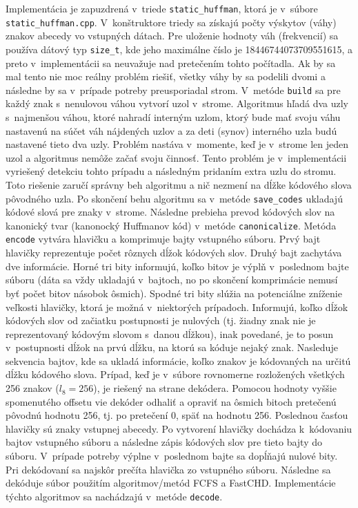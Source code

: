 \documentclass[10pt,a4paper]{article}
\begin{document}
Implementácia je zapuzdrená v~triede \texttt{static\_huffman}, ktorá je v~súbore \texttt{static\_huffman.cpp}. V~konštruktore triedy sa získajú počty výskytov (váhy) znakov abecedy vo vstupných dátach. Pre uloženie hodnoty váh (frekvencií) sa používa dátový typ \texttt{size\_t}, kde jeho maximálne číslo je 18446744073709551615, a preto v~implementácii sa neuvažuje nad pretečením tohto počítadla. Ak by sa mal tento nie moc reálny problém riešiť, všetky váhy by sa podelili dvomi a následne by sa v~prípade potreby preusporiadal strom. V~metóde \texttt{build} sa pre každý znak s~nenulovou váhou vytvorí uzol v~strome. Algoritmus hľadá dva uzly s~najmenšou váhou, ktoré nahradí interným uzlom, ktorý bude mať svoju váhu nastavenú na súčet váh nájdených uzlov a za deti (synov) interného uzla budú nastavené tieto dva uzly. Problém nastáva v~momente, keď je v~strome len jeden uzol a algoritmus nemôže začať svoju činnosť. Tento problém je v~implementácii vyriešený detekciu tohto prípadu a následným pridaním extra uzlu do stromu. Toto riešenie zaručí správny beh algoritmu a nič nezmení na dĺžke kódového slova pôvodného uzla. Po skončení behu algoritmu sa v~metóde \texttt{save\_codes} ukladajú kódové slová pre znaky v~strome. Následne prebieha prevod kódových slov na kanonický tvar (kanonocký Huffmanov kód) v~metóde \texttt{canonicalize}. Metóda \texttt{encode} vytvára hlavičku a komprimuje bajty vstupného súboru. Prvý bajt hlavičky reprezentuje počet rôznych dĺžok kódových slov. Druhý bajt zachytáva dve informácie. Horné tri bity informujú, koľko bitov je výplň v~poslednom bajte súboru (dáta sa vždy ukladajú v~bajtoch, no po skončení komprimácie nemusí byť počet bitov násobok ôsmich). Spodné tri bity slúžia na potenciálne zníženie veľkosti hlavičky, ktorá je možná v~niektorých prípadoch. Informujú, koľko dĺžok kódových slov od začiatku postupnosti je nulových (tj. žiadny znak nie je reprezentovaný kódovým slovom s~danou dĺžkou), inak povedané, je to posun v~postupnosti dĺžok na prvú dĺžku, na ktorú sa kóduje nejaký znak. Nasleduje sekvencia bajtov, kde sa ukladá informácie, koľko znakov je kódovaných na určitú dĺžku kódového slova. Prípad, keď je v~súbore rovnomerne rozložených všetkých 256 znakov ($l_8 = 256$), je riešený na strane dekódera. Pomocou hodnoty vyššie spomenutého offsetu vie dekóder odhaliť a opraviť na ôsmich bitoch pretečenú pôvodnú hodnotu 256, tj. po pretečení 0, späť na hodnotu 256. Poslednou časťou hlavičky sú znaky vstupnej abecedy. Po vytvorení hlavičky dochádza k~kódovaniu bajtov vstupného súboru a následne zápis kódových slov pre tieto bajty do súboru. V~prípade potreby výplne v~poslednom bajte sa dopĺňajú nulové bity. Pri dekódovaní sa najskôr prečíta hlavička zo vstupného súboru. Následne sa dekóduje súbor použitím algoritmov/metód FCFS a FastCHD. Implementácie týchto algoritmov sa nachádzajú v~metóde \texttt{decode}.
\end{document}
